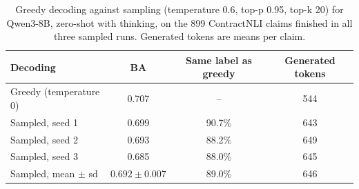\documentclass[11pt]{article}
\begin{document}
\begin{table}[H]
\centering
\footnotesize
\setlength{\tabcolsep}{6pt}
\begin{tabular}{lccc}
\toprule
\textbf{Decoding} & \textbf{BA} & \textbf{Same label as greedy} & \textbf{Generated tokens} \\
\midrule
Greedy (temperature 0)  & 0.707 & --     & 544 \\
Sampled, seed 1         & 0.699 & 90.7\% & 643 \\
Sampled, seed 2         & 0.693 & 88.2\% & 649 \\
Sampled, seed 3         & 0.685 & 88.0\% & 645 \\
\midrule
Sampled, mean $\pm$ sd  & $0.692 \pm 0.007$ & 89.0\% & 646 \\
\bottomrule
\end{tabular}
\caption{Greedy decoding against sampling (temperature 0.6, top-p 0.95,
top-k 20) for Qwen3-8B, zero-shot with thinking, on the 899 ContractNLI
claims finished in all three sampled runs. Generated tokens are means per
claim.}
\label{tab:greedy}
\end{table}
\end{document}
